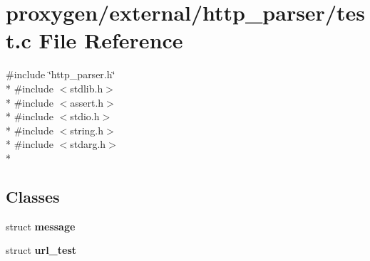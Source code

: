 \section{proxygen/external/http\+\_\+parser/test.c File Reference}
\label{test_8c}
{\ttfamily \#include \char`\"{}http\+\_\+parser.\+h\char`\"{}}\\*
{\ttfamily \#include $<$stdlib.\+h$>$}\\*
{\ttfamily \#include $<$assert.\+h$>$}\\*
{\ttfamily \#include $<$stdio.\+h$>$}\\*
{\ttfamily \#include $<$string.\+h$>$}\\*
{\ttfamily \#include $<$stdarg.\+h$>$}\\*
\subsection*{Classes}
\begin{DoxyCompactItemize}
\item 
struct {\bf message}
\item 
struct {\bf url\+\_\+test}
\end{DoxyCompactItemize}
